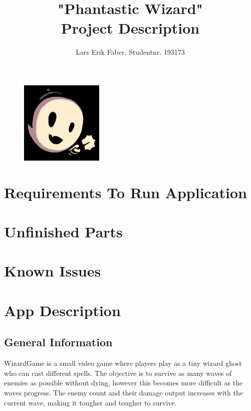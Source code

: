 \documentclass[12pt]{article}
\begin{document}
\title{%
    "Phantastic Wizard"\\
    \large Project Description}
\author{Lars Erik Faber, Studentnr. 193173}
\date{}
\maketitle

\begin{figure}[h!]
    \centering
    \includegraphics[scale=5.0]{images/logo.png}
\end{figure}

\newpage

\tableofcontents

\newpage

\section{Requirements To Run Application}

\section{Unfinished Parts}

\section{Known Issues}

\section{App Description}

    \subsection{General Information}

    WizardGame is a small video game where players play as a tiny wizard ghost who can cast different spells. The objective is to survive as many waves of enemies as possible without dying, however this becomes more difficult as the waves progress. The enemy count and their damage output increases with the current wave, making it tougher and tougher to survive. 
    
\end{document}
